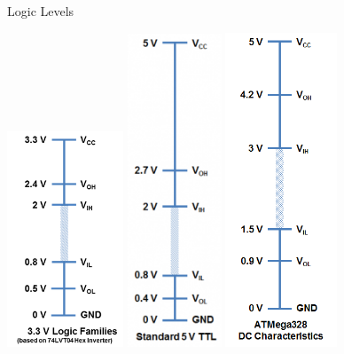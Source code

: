 \documentclass[beamer]{standalone}
\begin{document}
\begin{frame}{Logic Levels}
\begin{center}
\includegraphics[width=0.26\textwidth]{pics/CMOS_levels}
\includegraphics[width=0.21\textwidth]{pics/TTL_levels}
\includegraphics[width=0.25\textwidth]{pics/arduino_levels}
\end{center}
\end{frame}
\end{document}
